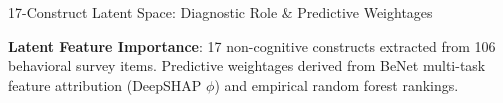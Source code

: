 \documentclass{beamer}
\begin{document}
\begin{frame}[t]{17-Construct Latent Space: Diagnostic Role \& Predictive Weightages}
  \vspace{-0.25cm}
  \begin{topsummarybar}
    \fontsize{5.8pt}{7.0pt}\selectfont
    \textbf{\color{NavyDark}Latent Feature Importance}: 17 non-cognitive constructs extracted from 106 behavioral survey items. Predictive weightages derived from BeNet multi-task feature attribution (DeepSHAP $\phi$) and empirical random forest rankings.
  \end{topsummarybar}
  \vspace{-0.25cm}


\end{frame}
\end{document}
